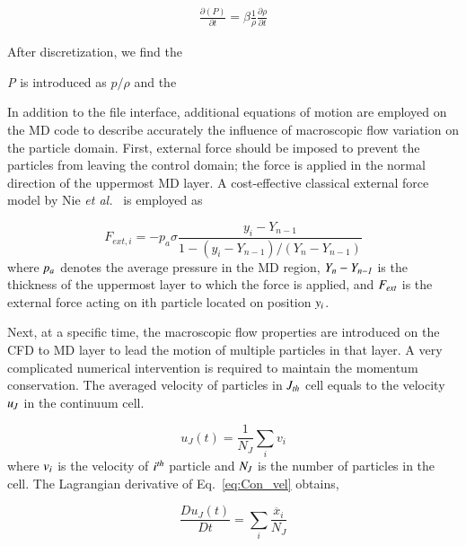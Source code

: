 \documentclass[preprint,12pt]{elsarticle}
\begin{document}
\vspace{-.2em}
\begin{eqnarray}
\frac{\partial (P)}{\partial t} = \beta \frac{1}{\rho} \frac{\partial \rho}{\partial t}
\label{eq:DensityConversion}
\end{eqnarray}

After discretization, we find the 

\textit{P} is introduced as $p/\rho$ and the 

\label{eq:Pseudo}





In addition to the file interface, additional equations of motion are employed on the MD code to describe accurately the influence of macroscopic flow variation on the particle domain. First, external force should be imposed to prevent the particles from leaving the control domain; the force is applied in the normal direction of the uppermost MD layer. A cost-effective classical external force model by Nie {\it{et al.}}~\cite{Nie} is employed as


\vspace{-.2em}
\begin{equation}
 F_{ext, i} = -p_{a}\sigma\frac{y_{i}-Y_{n-1}}{1-(y_{i}-Y_{n-1})/(Y_{n}-Y_{n-1})}
 \label{eq:External_Force}
\end{equation}
\normalsize
where  $\it p_{a}$ denotes the average pressure in the MD region, $\it Y_{n}-Y_{n-1}$ is the thickness of the uppermost layer to which the force is applied, and $\it F_{ext}$ is the external force acting on ith particle located on position $\it y_{i}$.


Next, at a specific time, the macroscopic flow properties are introduced on the CFD to MD layer to lead the motion of multiple particles in that layer. A very complicated numerical intervention is required to maintain the momentum conservation. The averaged velocity of particles in $\it J_{th}$ cell equals to the velocity $\it u_{J}$ in the continuum cell.


\vspace{-.2em}
\begin{equation}
 u_{J}(t) = \frac{1}{N_{J}} \displaystyle\sum_{i} v_{i}
 \label{eq:Con_vel}
\end{equation}
\normalsize
where $\it v_{i}$ is the velocity of $\it i^{th}$ particle and $\it N_{J}$ is the number of particles in the cell. The Lagrangian derivative of Eq.~\ref{eq:Con_vel} obtains,

\vspace{-.2em}
\begin{equation}
 \frac{Du_{J}(t)}{Dt} =  \displaystyle\sum_{i} \frac{\ddot{x_{i}}}{N_{J}}
 \label{eq:Lagrangian}
\end{equation}
\normalsize
\end{document}

